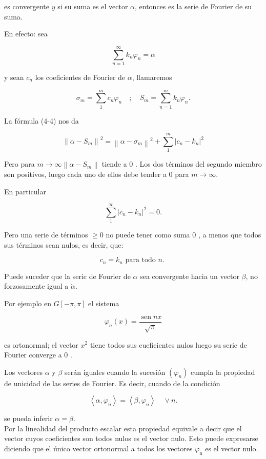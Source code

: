 \documentclass[10pt]{article}
\theoremstyle{plain}
\theoremstyle{definition}
\theoremstyle{remark}
\begin{document}
es convergente $y$ si su suma es el vector $\alpha$, entonces es la serie de Fourier de su suma.

En efecto: sea

$$
\sum_{n=1}^{\infty} k_{n} \varphi_{n}=\alpha
$$

y sean $c_{n}$ los coeficientes de Fourier de $\alpha$, llamaremos

$$
\sigma_{m}=\sum_{1}^{m} c_{n} \varphi_{n} \quad ; \quad S_{m}=\sum_{n=1}^{m} k_{n} \varphi_{n} .
$$

La fórmula (4-4) nos da

$$
\left\|\alpha-S_{m}\right\|^{2}=\left\|\alpha-\sigma_{m}\right\|^{2}+\sum_{1}^{m}\left|c_{n}-k_{n}\right|^{2}
$$

Pero para $m \rightarrow \infty\left\|\alpha-S_{m}\right\|$ tiende a 0 . Los dos términos del segundo miembro son positivos, luego cada uno de ellos debe tender a 0 para $m \rightarrow \infty$.

En particular

$$
\sum_{1}^{\infty}\left|c_{n}-k_{n}\right|^{2}=0 .
$$

Pero una serie de términos $\geqslant 0$ no puede tener como suma 0 , a menos que todos sus términos sean nulos, es decir, que:

$$
c_{n}=k_{n} \text { para todo } n \text {. }
$$

Puede suceder que la seric de Fourier de $\alpha$ sea convergente hacia un vector $\beta$, no forzosamente igual a $\dot{\alpha}$.

Por ejemplo en $G[-\pi, \pi]$ el sistema

$$
\varphi_{n}(x)=\frac{\operatorname{sen} n x}{\sqrt{\pi}}
$$

es ortonormal; el vector $x^{2}$ tiene todos sus cueficientes nulos luego su serie de Fourier converge a 0 .

Los vectores $\alpha$ y $\beta$ serán iguales cuando la sucesión $\left(\varphi_{n}\right)$ cumpla la propiedad de unicidad de las series de Fourier. Es decir, cuando de la condición

$$
\left\langle\alpha, \varphi_{n}\right\rangle=\left\langle\beta, \varphi_{n}\right\rangle \quad \vee n .
$$

se pueda inferir $\alpha=\beta$.\\
Por la linealidad del producto escalar esta propiedad equivale a decir que el vector cuyos coeficientes son todos nulos es el vector nulo. Esto puede expresarse diciendo que el único vector ortonormal a todos los vectores $\varphi_{\mathrm{n}}$ es el vector nulo.
\end{document}
